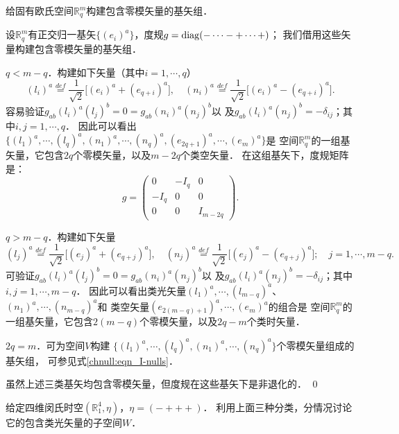 \begin{example}\label{chnull:exm_Em-bases}
给固有欧氏空间$\mathbb{R}^m_q$构建包含零模矢量的基矢组．
\end{example}

设$\mathbb{R}^m_q$有正交归一基矢$\{(e_i)^a\}$，度规$g={\rm diag}(-\cdots -+\cdots +)$；
我们借用这些矢量构建包含零模矢量的基矢组．

$q< m-q$．构建如下矢量（其中$i=1,\cdots,q$）
\begin{equation}\label{chnull:eqn_I-nulls}
    (l_i)^a \overset{def}{=} \frac{1}{\sqrt{2}} \bigl[ (e_{i})^a + (e_{q+i})^a \bigr] ,\quad  
    (n_i)^a \overset{def}{=} \frac{1}{\sqrt{2}} \bigl[ (e_{i})^a - (e_{q+i})^a \bigr] .
\end{equation}
容易验证$g_{ab}(l_i)^a (l_j)^b=0=g_{ab}(n_i)^a (n_j)^b$以
及$g_{ab}(l_i)^a (n_j)^b=-\delta_{ij}$；其中$i,j=1,\cdots,q$．
因此可以看出$\{(l_1)^a,\cdots,(l_q)^a,(n_1)^a,\cdots,(n_q)^a,(e_{2q+1})^a,\cdots,(e_m)^a\}$是
空间$\mathbb{R}^m_q$的一组基矢量，它包含$2q$个零模矢量，以及$m-2q$个类空矢量．
在这组基矢下，度规矩阵是：
\begin{equation}
    g=\begin{pmatrix}
        0 & -I_q &0 \\
        -I_q & 0 &0 \\
        0& 0 & I_{m-2q}
    \end{pmatrix}.
\end{equation}

$q> m-q$．构建如下矢量
\begin{equation*}%
    (l_j)^a \overset{def}{=} \frac{1}{\sqrt{2}} \bigl[ (e_{j})^a + (e_{q+j})^a \bigr] ,\quad  
    (n_j)^a \overset{def}{=} \frac{1}{\sqrt{2}} \bigl[ (e_{j})^a - (e_{q+j})^a \bigr] ;\quad j=1,\cdots,m-q.
\end{equation*}
可验证$g_{ab}(l_i)^a (l_j)^b=0=g_{ab}(n_i)^a (n_j)^b$以
及$g_{ab}(l_i)^a (n_j)^b=-\delta_{ij}$；其中$i,j=1,\cdots,m-q$．
因此可以看出类光矢量$(l_1)^a,\cdots,(l_{m-q})^a$、$ (n_1)^a,\cdots,(n_{m-q})^a$和
类空矢量$(e_{2(m-q)+1})^a,\cdots,(e_m)^a$的组合是
空间$\mathbb{R}^m_q$的一组基矢量，它包含$2(m-q)$个零模矢量，以及$2q-m$个类时矢量．

$2q= m$．可为空间$V$构建
$\{(l_1)^a,\cdots,(l_q)^a,(n_1)^a,\cdots,(n_q)^a\}$个零模矢量组成的基矢组，
可参见式\eqref{chnull:eqn_I-nulls}．

虽然上述三类基矢均包含零模矢量，但度规在这些基矢下是非退化的．
\qed

\begin{example}\label{chnull:exm_R41}
    给定四维闵氏时空$(\mathbb{R}^4_1,\eta)$，$\eta=(-+++)$．
    利用上面三种分类，分情况讨论它的包含类光矢量的子空间$W$．
\end{example}

